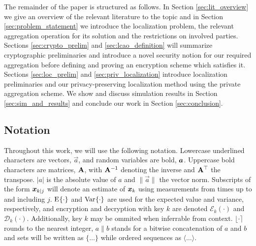 \documentclass[10pt,letterpaper,oneside,twocolumn,journal]{IEEEtran}
\theoremstyle{definition}
\theoremstyle{definition}
\theoremstyle{remark}
\begin{document}
The remainder of the paper is structured as follows. In Section \ref{sec:lit_overview} we give an overview of the relevant literature to the topic and in Section \ref{sec:problem_statement} we introduce the localization problem, the relevant aggregation operation for its solution and the restrictions on involved parties. Sections \ref{sec:crypto_prelim} and \ref{sec:lcao_definition} will summarize cryptographic preliminaries and introduce a novel security notion for our required aggregation before defining and proving an encryption scheme which satisfies it. Sections \ref{sec:loc_prelim} and \ref{sec:priv_localization} introduce localization preliminaries and our privacy-preserving localization method using the private aggregation scheme. We show and discuss simulation results in Section \ref{sec:sim_and_results} and conclude our work in Section \ref{sec:conclusion}.

% 
% 

\subsection{Notation}
Throughout this work, we will use the following notation. Lowercase underlined characters are vectors, $\vec{a}$, and random variables are bold, ${\boldsymbol{a}}$. Uppercase bold characters are matrices, ${{\mathbf{A}}}$, with ${{\mathbf{A}}}^{-1}$ denoting the inverse and ${{\mathbf{A}}}^\top$ the transpose. $|a|$ is the absolute value of $a$ and $\lVert\vec{a}\rVert$ the vector norm. Subscripts of the form ${\boldsymbol{x}}_{k|j}$ will denote an estimate of ${\boldsymbol{x}}_k$ using measurements from times up to and including $j$. $\E{\cdot}$ and $\Var{\cdot}$ are used for the expected value and variance, respectively, and encryption and decryption with key $k$ are denoted $\mathcal{E}_{k}(\cdot)$ and $\mathcal{D}_{k}(\cdot)$. Additionally, key $k$ may be ommited when inferrable from context. $\lfloor\cdot\rceil$ rounds to the nearest integer, $a\|b$ stands for a bitwise concatenation of $a$ and $b$ and sets will be written as $\{\dots\}$ while ordered sequences as $\langle\dots\rangle$.
\end{document}

